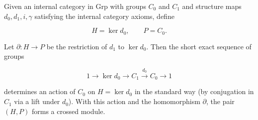 Given an internal category in Grp with groups $C_0$ and $C_1$ and structure maps $d_0, d_1, i, \gamma$ satisfying the internal category axioms, define

$$H = \ker d_0, \qquad P = C_0.$$

Let $\partial : H \to P$ be the restriction of $d_1$ to $\ker d_0$. Then the short exact sequence of groups

$$1 \to \ker d_0 \to C_1 \xrightarrow{d_0} C_0 \to 1$$

determines an action of $C_0$ on $H = \ker d_0$ in the standard way (by conjugation in $C_1$ via a lift under $d_0$). With this action and the homomorphism $\partial$, the pair $(H, P)$ forms a crossed module.
